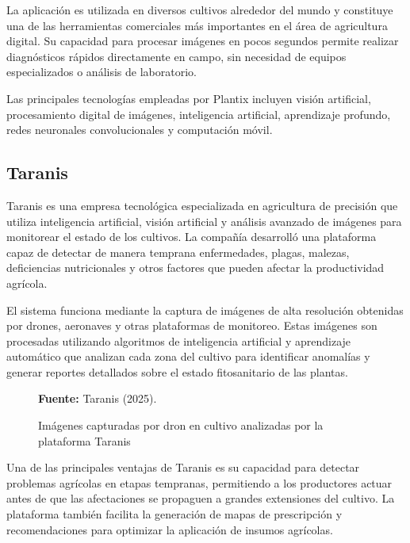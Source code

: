 La aplicación es utilizada en diversos cultivos alrededor del mundo y constituye una de las herramientas comerciales más importantes en el área de agricultura digital. Su capacidad para procesar imágenes en pocos segundos permite realizar diagnósticos rápidos directamente en campo, sin necesidad de equipos especializados o análisis de laboratorio.

Las principales tecnologías empleadas por Plantix incluyen visión artificial, procesamiento digital de imágenes, inteligencia artificial, aprendizaje profundo, redes neuronales convolucionales y computación móvil.


\subsection{Taranis}

Taranis es una empresa tecnológica especializada en agricultura de precisión que utiliza inteligencia artificial, visión artificial y análisis avanzado de imágenes para monitorear el estado de los cultivos. La compañía desarrolló una plataforma capaz de detectar de manera temprana enfermedades, plagas, malezas, deficiencias nutricionales y otros factores que pueden afectar la productividad agrícola.

El sistema funciona mediante la captura de imágenes de alta resolución obtenidas por drones, aeronaves y otras plataformas de monitoreo. Estas imágenes son procesadas utilizando algoritmos de inteligencia artificial y aprendizaje automático que analizan cada zona del cultivo para identificar anomalías y generar reportes detallados sobre el estado fitosanitario de las plantas.

\begin{figure}[H]
    \centering
    \caption{Imágenes capturadas por dron en cultivo analizadas por la plataforma Taranis}
    \label{fig:1_2_4}
    \vspace{0.2cm}
    \footnotesize \textbf{Fuente:} Taranis (2025).
\end{figure}

Una de las principales ventajas de Taranis es su capacidad para detectar problemas agrícolas en etapas tempranas, permitiendo a los productores actuar antes de que las afectaciones se propaguen a grandes extensiones del cultivo. La plataforma también facilita la generación de mapas de prescripción y recomendaciones para optimizar la aplicación de insumos agrícolas.

